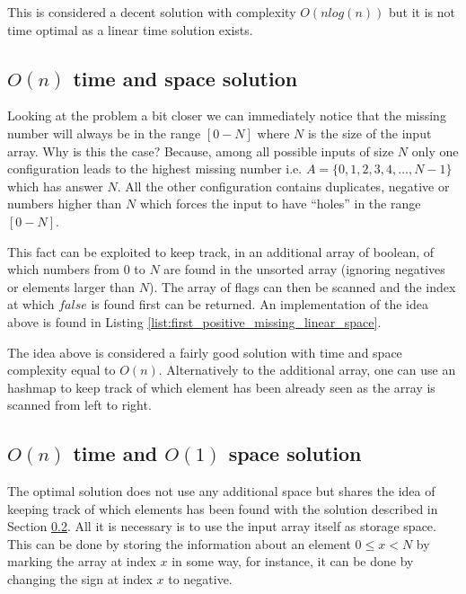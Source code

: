 This is considered a decent solution with complexity $O(nlog(n))$ but it is not time optimal as a linear time solution exists. 

\subsection{$O(n)$ time and space solution}
\label{first_positive_missing:sec:linear_space}

Looking at the problem a bit closer we can immediately notice that the missing number will always be in the range $[0-N]$ where $N$ is the size of the input array. Why is this the case? Because, among all possible inputs of size $N$ only one configuration leads to the highest missing number i.e. $A = \{0,1,2,3,4, \ldots ,N-1\}$ which has answer $N$. All the other configuration contains duplicates, negative or numbers higher than $N$ which forces the input to have ``holes'' in the range $[0-N]$. 

This fact can be exploited to keep track, in an additional array of boolean, of which numbers from $0$ to $N$ are found in the unsorted array (ignoring negatives or elements larger than $N$). The array of flags can then be scanned and the index at which $false$ is found first can be returned. An implementation of the idea above is found in Listing \ref{list:first_positive_missing_linear_space}.



The idea above is considered a fairly good solution with time and space complexity equal to $O(n)$. 
Alternatively to the additional array, one can use an hashmap to keep track of which element has been already seen as the array is scanned from left to right.

\subsection{$O(n)$ time and $O(1)$ space solution}
\label{first_positive_missing:sec:linear_space}
The optimal solution does not use any additional space but shares the idea of keeping track of which elements has been found with the solution described in Section \ref{first_positive_missing:sec:linear_space}. All it is necessary is to use the input array itself as storage space. This can be done by storing the information about an element $0 \leq x < N$ by marking the array at index $x$ in some way, for instance, it can be done by changing the sign at index $x$ to negative.



